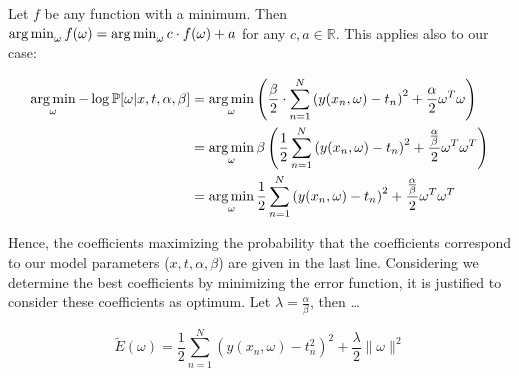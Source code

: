 Let $f$ be any function with a minimum. Then $\operatorname*{arg\,min}_{\omega} f(\omega) = \operatorname*{arg\,min}_{\omega} c \cdot f(\omega) + a$ for any $c, a \in \mathbb R$.
This applies also to our case:

\begin{align}
  \operatorname*{arg\,min}_{\omega} -\log{\mathbb P[\omega|x,t,\alpha,\beta]}
    &= \operatorname*{arg\,min}_{\omega} \left(\frac\beta2 \cdot \sum_{n=1}^N \left(y(x_n, \omega) - t_n\right)^2 + \frac\alpha2 \omega^T \omega\right) \\
    &= \operatorname*{arg\,min}_{\omega} \beta\left(\frac12 \sum_{n=1}^N \left(y(x_n, \omega) - t_n\right)^2 + \frac{\frac\alpha\beta}{2} \omega^T \omega^T\right) \\
    &= \operatorname*{arg\,min}_{\omega} \frac12 \sum_{n=1}^N \left(y(x_n, \omega) - t_n\right)^2 + \frac{\frac\alpha\beta}{2} \omega^T \omega^T \\
\end{align}

Hence, the coefficients maximizing the probability that the coefficients correspond to our model parameters ($x, t, \alpha, \beta$) are given in the last line.
Considering we determine the best coefficients by minimizing the error function, it is justified to consider these coefficients as optimum. Let $\lambda = \frac{\alpha}{\beta}$, then \dots

\[ \tilde{E}(\omega) = \frac12 \sum_{n=1}^N \left(y(x_n, \omega) - t_n^2\right)^2 + \frac{\lambda}{2} \|\omega\|^2 \]

